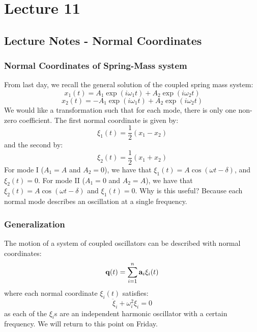 \documentclass[../PHYS306Notes.tex]{subfiles}
\begin{document}
\section{Lecture 11}
\subsection{Lecture Notes - Normal Coordinates}
\subsubsection{Normal Coordinates of Spring-Mass system}
From last day, we recall the general solution of the coupled spring mass system:
\[x_1(t) = A_1\exp(i\omega_1 t) + A_2\exp(i\omega_2 t)\]
\[x_2(t) = -A_1\exp(i\omega_1 t) + A_2\exp(i \omega_2 t)\]
We would like a transformation such that for each mode, there is only one non-zero coefficient. The first normal coordinate is given by:
\[\xi_1(t) = \frac{1}{2}(x_1 - x_2)\]
and the second by:
\[\xi_2(t) = \frac{1}{2}(x_1 + x_2)\]
For mode I ($A_1 = A$ and $A_2 = 0$), we have that $\xi_1(t) = A\cos(\omega t - \delta)$, and $\xi_2(t) = 0$. For mode II ($A_1 = 0$ and $A_2 = A$), we have that $\xi_2(t) = A\cos(\omega t - \delta)$ and $\xi_1(t) = 0$. Why is this useful? Because each normal mode describes an oscillation at a single frequency.
\subsubsection{Generalization}
The motion of a system of coupled oscillators can be described with normal coordinates:
\[\mathbf{q}(t) = \sum_{i=1}^n\mathbf{a}_i\xi_i(t)\]
where each normal coordinate $\xi_i(t)$ satisfies:
\[\ddot{\xi}_i + \omega_i^2\xi_i = 0\]
as each of the $\xi_i$s are an independent harmonic oscillator with a certain frequency. We will return to this point on Friday.
\end{document}
